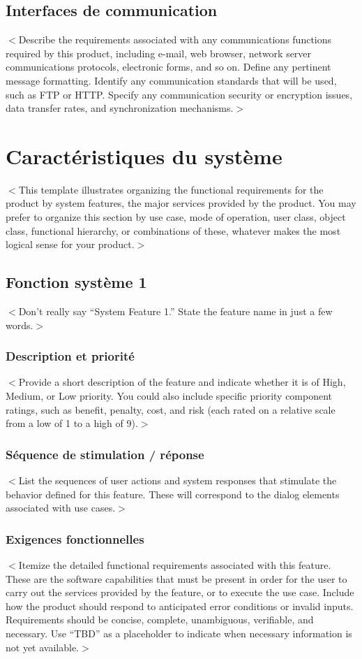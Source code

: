 \documentclass[titlepage, 12pt]{report}
\begin{document}
\section{Interfaces de communication}
$<$Describe the requirements associated with any communications functions 
required by this product, including e-mail, web browser, network server 
communications protocols, electronic forms, and so on. Define any pertinent 
message formatting. Identify any communication standards that will be used, such 
as FTP or HTTP. Specify any communication security or encryption issues, data 
transfer rates, and synchronization mechanisms.$>$


\chapter{Caractéristiques du système}
$<$This template illustrates organizing the functional requirements for the 
product by system features, the major services provided by the product. You may 
prefer to organize this section by use case, mode of operation, user class, 
object class, functional hierarchy, or combinations of these, whatever makes the 
most logical sense for your product.$>$

\section{Fonction système 1}
$<$Don’t really say “System Feature 1.” State the feature name in just a few 
words.$>$

\subsection{Description et priorité}
$<$Provide a short description of the feature and indicate whether it is of 
High, Medium, or Low priority. You could also include specific priority 
component ratings, such as benefit, penalty, cost, and risk (each rated on a 
relative scale from a low of 1 to a high of 9).$>$

\subsection{Séquence de stimulation / réponse}
$<$List the sequences of user actions and system responses that stimulate the 
behavior defined for this feature. These will correspond to the dialog elements 
associated with use cases.$>$

\subsection{Exigences fonctionnelles}
$<$Itemize the detailed functional requirements associated with this feature.  
These are the software capabilities that must be present in order for the user 
to carry out the services provided by the feature, or to execute the use case.  
Include how the product should respond to anticipated error conditions or 
invalid inputs. Requirements should be concise, complete, unambiguous, 
verifiable, and necessary. Use “TBD” as a placeholder to indicate when necessary 
information is not yet available.$>$
\end{document}
